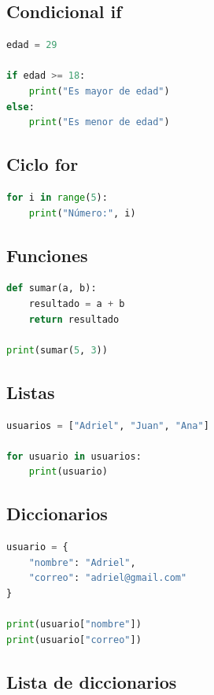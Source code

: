 \documentclass[12pt]{article}
\begin{document}
\subsection{Condicional if}

\begin{lstlisting}[language=Python]
edad = 29

if edad >= 18:
    print("Es mayor de edad")
else:
    print("Es menor de edad")
\end{lstlisting}

\subsection{Ciclo for}

\begin{lstlisting}[language=Python]
for i in range(5):
    print("Número:", i)
\end{lstlisting}

\subsection{Funciones}

\begin{lstlisting}[language=Python]
def sumar(a, b):
    resultado = a + b
    return resultado

print(sumar(5, 3))
\end{lstlisting}

\subsection{Listas}

\begin{lstlisting}[language=Python]
usuarios = ["Adriel", "Juan", "Ana"]

for usuario in usuarios:
    print(usuario)
\end{lstlisting}

\subsection{Diccionarios}

\begin{lstlisting}[language=Python]
usuario = {
    "nombre": "Adriel",
    "correo": "adriel@gmail.com"
}

print(usuario["nombre"])
print(usuario["correo"])
\end{lstlisting}

\subsection{Lista de diccionarios}
\end{document}
